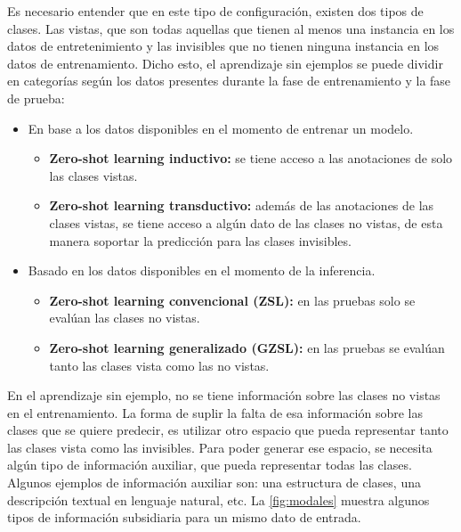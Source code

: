 Es necesario entender que en este tipo de configuración, existen dos tipos de clases. Las vistas, que son todas aquellas que tienen al menos una instancia en los datos de entretenimiento y las invisibles que no tienen ninguna instancia en los datos de entrenamiento. Dicho esto, el aprendizaje sin ejemplos se puede dividir en categorías según los datos presentes durante la fase de entrenamiento y la fase de prueba:
\begin{itemize}
	\item En base a los datos disponibles en el momento de entrenar un modelo.
	\begin{itemize}
		\item \textbf{Zero-shot learning inductivo:} se tiene acceso a las anotaciones de solo las clases vistas.
		\item \textbf{Zero-shot learning transductivo:} además de las anotaciones de las clases vistas, se tiene acceso a algún dato de las clases no vistas, de esta manera soportar la predicción para las clases invisibles.
	\end{itemize}
	\item Basado en los datos disponibles en el momento de la inferencia.
	\begin{itemize}
		\item \textbf{Zero-shot learning convencional (ZSL):} en las pruebas solo se evalúan las clases no vistas.
		\item \textbf{Zero-shot learning generalizado (GZSL):} en las pruebas se evalúan tanto las clases vista como las no vistas.
	\end{itemize}
\end{itemize}

En el aprendizaje sin ejemplo, no se tiene información sobre las clases no vistas en el entrenamiento. La forma de suplir la falta de esa información sobre las clases que se quiere predecir, es utilizar otro espacio que pueda representar tanto las clases vista como las invisibles. Para poder generar ese espacio, se necesita algún tipo de información auxiliar, que pueda representar todas las clases.
Algunos ejemplos de información auxiliar son: una estructura de clases, una descripción textual en lenguaje natural, etc. La \autoref{fig:modales} muestra algunos tipos de información subsidiaria para un mismo dato de entrada.

